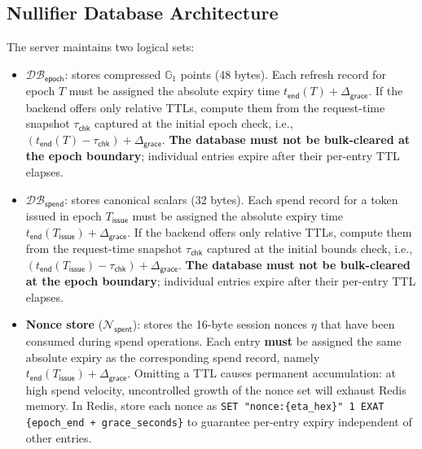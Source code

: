 \documentclass[11pt]{article}
\theoremstyle{definitionstyle}
\theoremstyle{plain}
\newcommand{\DB}{\mathcal{DB}}
\begin{document}
\subsection{Nullifier Database Architecture}

The server maintains two logical sets:

\begin{itemize}
\item $\DB_{\mathsf{epoch}}$: stores compressed $\mathbb{G}_1$ points (48 bytes). Each refresh record for epoch $T$ must be assigned the absolute expiry time $t_{\mathsf{end}}(T)+\Delta_{\mathsf{grace}}$. If the backend offers only relative TTLs, compute them from the request-time snapshot $\tau_{\mathsf{chk}}$ captured at the initial epoch check, i.e., $(t_{\mathsf{end}}(T)-\tau_{\mathsf{chk}})+\Delta_{\mathsf{grace}}$. \textbf{The database must not be bulk-cleared at the epoch boundary}; individual entries expire after their per-entry TTL elapses.
\item $\DB_{\mathsf{spend}}$: stores canonical scalars (32 bytes). Each spend record for a token issued in epoch $T_{\mathsf{issue}}$ must be assigned the absolute expiry time $t_{\mathsf{end}}(T_{\mathsf{issue}})+\Delta_{\mathsf{grace}}$. If the backend offers only relative TTLs, compute them from the request-time snapshot $\tau_{\mathsf{chk}}$ captured at the initial bounds check, i.e., $(t_{\mathsf{end}}(T_{\mathsf{issue}})-\tau_{\mathsf{chk}})+\Delta_{\mathsf{grace}}$. \textbf{The database must not be bulk-cleared at the epoch boundary}; individual entries expire after their per-entry TTL elapses.
\item \textbf{Nonce store} ($\mathcal{N}_{\mathsf{spent}}$): stores the 16-byte session nonces $\eta$ that have been consumed during spend operations. Each entry \textbf{must} be assigned the same absolute expiry as the corresponding spend record, namely $t_{\mathsf{end}}(T_{\mathsf{issue}})+\Delta_{\mathsf{grace}}$. Omitting a TTL causes permanent accumulation: at high spend velocity, uncontrolled growth of the nonce set will exhaust Redis memory. In Redis, store each nonce as \verb|SET "nonce:{eta_hex}" 1 EXAT {epoch_end + grace_seconds}| to guarantee per-entry expiry independent of other entries.
\end{itemize}
\end{document}
